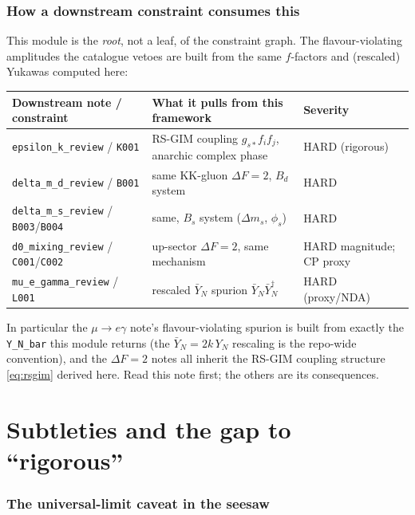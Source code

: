\documentclass[11pt]{article}
\newcommand{\gss}{g_{s*}}
\newcommand{\code}[1]{\texttt{#1}}
\theoremstyle{definition}
\begin{document}
\section{How a downstream constraint consumes this}
\label{sec:xref}

This module is the \emph{root}, not a leaf, of the constraint graph. The
flavour-violating amplitudes the catalogue vetoes are built from the same
$f$-factors and (rescaled) Yukawas computed here:
\begin{center}
\begin{tabular}{lll}
\toprule
Downstream note / constraint & What it pulls from this framework & Severity \\
\midrule
\code{epsilon\_k\_review} / \code{K001} & RS-GIM coupling $\gss f_i f_j$, anarchic complex phase & HARD (rigorous) \\
\code{delta\_m\_d\_review} / \code{B001} & same KK-gluon $\Delta F=2$, $B_d$ system & HARD \\
\code{delta\_m\_s\_review} / \code{B003}/\code{B004} & same, $B_s$ system ($\Delta m_s$, $\phi_s$) & HARD \\
\code{d0\_mixing\_review} / \code{C001}/\code{C002} & up-sector $\Delta F=2$, same mechanism & HARD magnitude; CP proxy \\
\code{mu\_e\_gamma\_review} / \code{L001} & rescaled $\bar Y_N$ spurion $\bar Y_N\bar Y_N^\dagger$ & HARD (proxy/NDA) \\
\bottomrule
\end{tabular}
\end{center}
In particular the $\mu\to e\gamma$ note's flavour-violating spurion is built from
exactly the \code{Y\_N\_bar} this module returns (the $\bar Y_N=2k\,Y_N$
rescaling is the repo-wide convention), and the $\Delta F=2$ notes all inherit the
RS-GIM coupling structure \eqref{eq:rsgim} derived here. Read this note first; the
others are its consequences.

\part{Subtleties and the gap to ``rigorous''}
\label{part:subtle}

\section{The universal-limit caveat in the seesaw}
\label{sec:univlimit}
\end{document}
